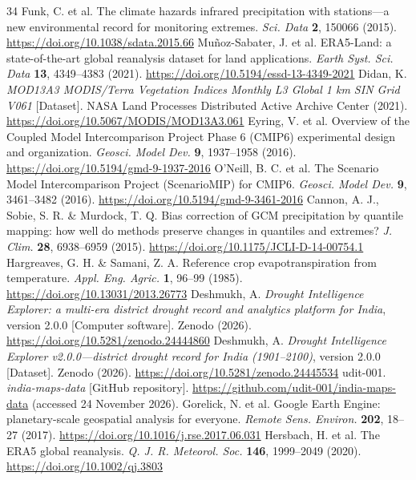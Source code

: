 \documentclass[11pt,a4paper]{article}
\begin{document}
\begin{thebibliography}{34}
 Funk, C. et al. The climate hazards infrared precipitation with stations---a new environmental record for monitoring extremes. \textit{Sci. Data} \textbf{2}, 150066 (2015). \url{https://doi.org/10.1038/sdata.2015.66}
 Mu\~{n}oz-Sabater, J. et al. ERA5-Land: a state-of-the-art global reanalysis dataset for land applications. \textit{Earth Syst. Sci. Data} \textbf{13}, 4349--4383 (2021). \url{https://doi.org/10.5194/essd-13-4349-2021}
 Didan, K. \textit{MOD13A3 MODIS/Terra Vegetation Indices Monthly L3 Global 1 km SIN Grid V061} [Dataset]. NASA Land Processes Distributed Active Archive Center (2021). \url{https://doi.org/10.5067/MODIS/MOD13A3.061}
 Eyring, V. et al. Overview of the Coupled Model Intercomparison Project Phase 6 (CMIP6) experimental design and organization. \textit{Geosci. Model Dev.} \textbf{9}, 1937--1958 (2016). \url{https://doi.org/10.5194/gmd-9-1937-2016}
 O'Neill, B. C. et al. The Scenario Model Intercomparison Project (ScenarioMIP) for CMIP6. \textit{Geosci. Model Dev.} \textbf{9}, 3461--3482 (2016). \url{https://doi.org/10.5194/gmd-9-3461-2016}
 Cannon, A. J., Sobie, S. R. \& Murdock, T. Q. Bias correction of GCM precipitation by quantile mapping: how well do methods preserve changes in quantiles and extremes? \textit{J. Clim.} \textbf{28}, 6938--6959 (2015). \url{https://doi.org/10.1175/JCLI-D-14-00754.1}
 Hargreaves, G. H. \& Samani, Z. A. Reference crop evapotranspiration from temperature. \textit{Appl. Eng. Agric.} \textbf{1}, 96--99 (1985). \url{https://doi.org/10.13031/2013.26773}
 Deshmukh, A. \textit{Drought Intelligence Explorer: a multi-era district drought record and analytics platform for India}, version 2.0.0 [Computer software]. Zenodo (2026). \url{https://doi.org/10.5281/zenodo.24444860}
 Deshmukh, A. \textit{Drought Intelligence Explorer v2.0.0---district drought record for India (1901--2100)}, version 2.0.0 [Dataset]. Zenodo (2026). \url{https://doi.org/10.5281/zenodo.24445534}
 udit-001. \textit{india-maps-data} [GitHub repository]. \url{https://github.com/udit-001/india-maps-data} (accessed 24 November 2026).
 Gorelick, N. et al. Google Earth Engine: planetary-scale geospatial analysis for everyone. \textit{Remote Sens. Environ.} \textbf{202}, 18--27 (2017). \url{https://doi.org/10.1016/j.rse.2017.06.031}
 Hersbach, H. et al. The ERA5 global reanalysis. \textit{Q. J. R. Meteorol. Soc.} \textbf{146}, 1999--2049 (2020). \url{https://doi.org/10.1002/qj.3803}

\end{thebibliography}
\end{document}
